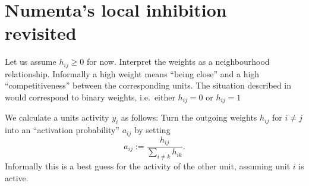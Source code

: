 \documentclass[titlepage]{amsart}
\theoremstyle{definition}
\begin{document}
% 
% 
\section{Numenta's local inhibition revisited}
% 
% 
% 
Let us assume $h_{ij} \geq 0$ for now. Interpret 
the weights as a neighbourhood relationship. Informally a high weight
means ``being close'' and a high ``competitiveness'' between the corresponding units.
The situation described in \cite{sp_paper} would correspond to binary weights, 
i.e.\ either $h_{ij} = 0$ or $h_{ij} = 1$

We calculate a units activity $y_i$ as follows:
Turn the outgoing weights $h_{ij}$ for $i \neq j$ into 
an ``activation probability'' $a_{ij}$ by setting
\[
      a_{ij} := \frac{h_{ij}}{\mathop{\sum}\limits_{i \neq k} h_{ik} }.
\]
Informally this is a best guess for the activity of the other unit, assuming
unit $i$ is active.
\end{document}
